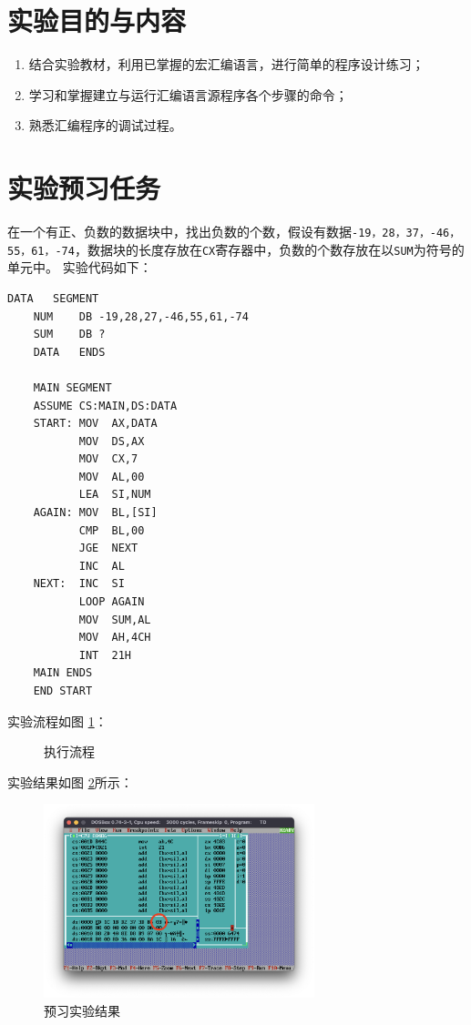 \documentclass[11pt]{SEU-Digital-Report}
\begin{document}
\exptitlepage

\tableofcontents
\newpage

\section{实验目的与内容}       
\begin{enumerate}
    \item 结合实验教材\cite{book,guide}，利用已掌握的宏汇编语言，进行简单的程序设计练习；
    \item 学习和掌握建立与运行汇编语言源程序各个步骤的命令；
    \item 熟悉汇编程序的调试过程。
\end{enumerate}

\section{实验预习任务}
在一个有正、负数的数据块中，找出负数的个数，假设有数据\texttt{-19，28，37，-46，55，61，-74}，数据块的长度存放在\texttt{CX}寄存器中，负数的个数存放在以\texttt{SUM}为符号的单元中。
实验代码如下：
\begin{lstlisting}[language={[x86masm]Assembler},title=exp30.asm]
    DATA   SEGMENT
    NUM    DB -19,28,27,-46,55,61,-74
    SUM    DB ?
    DATA   ENDS

    MAIN SEGMENT
    ASSUME CS:MAIN,DS:DATA
    START: MOV  AX,DATA
           MOV  DS,AX
           MOV  CX,7
           MOV  AL,00
           LEA  SI,NUM  
    AGAIN: MOV  BL,[SI]
           CMP  BL,00
           JGE  NEXT
           INC  AL
    NEXT:  INC  SI
           LOOP AGAIN
           MOV  SUM,AL
           MOV  AH,4CH
           INT  21H
    MAIN ENDS
    END START    
\end{lstlisting}

实验流程如图 \ref{fig:usingmethod}：
\begin{figure}[hbpt]
    \centering
    
    \caption{执行流程}
    \label{fig:usingmethod}
\end{figure}

实验结果如图 \ref{fig:rlt0}所示：
\begin{figure}[htbp]
    \centering
    \includegraphics[width=0.7\textwidth]{fig/rlt0.png}
    \caption{预习实验结果}
    \label{fig:rlt0}
\end{figure}
\end{document}
